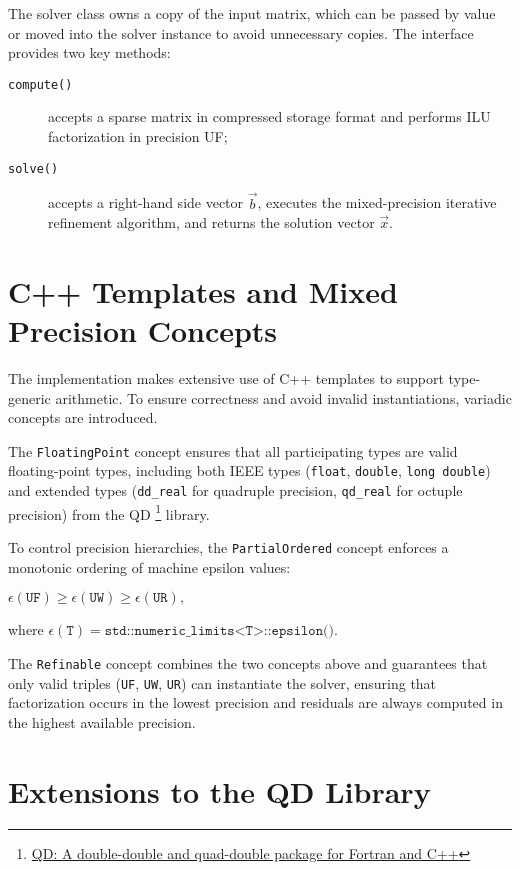 The solver class owns a copy of the input matrix, which can be passed by value
or moved into the solver instance to avoid unnecessary copies. The interface
provides two key methods:
\begin{description}
\item[\texttt{compute()}] accepts a sparse matrix in compressed storage format and performs
  ILU factorization in precision UF;
\item[\texttt{solve()}] accepts a right-hand side vector \(\vec{b}\), executes the mixed-precision
  iterative refinement algorithm, and returns the solution vector \(\vec{x}\).
\end{description}

\section{C++ Templates and Mixed Precision Concepts}
\label{sec:c++-templates-mixed}

The implementation makes extensive use of C++ templates to support type-generic
arithmetic. To ensure correctness and avoid invalid instantiations, variadic
concepts are introduced.

The \texttt{FloatingPoint} concept ensures that all participating types are valid
floating-point types, including both IEEE types (\texttt{float},
\texttt{double}, \texttt{long double}) and extended types (\texttt{dd\_real} for
quadruple precision, \texttt{qd\_real} for octuple precision) from the QD
\footnote{\href{https://github.com/BL-highprecision/QD}{QD: A double-double and
    quad-double package for Fortran and C++}} library.

To control precision hierarchies, the \texttt{PartialOrdered} concept enforces a
monotonic ordering of machine epsilon values:
\begin{center}
  \(\epsilon(\texttt{UF}) \ge \epsilon(\texttt{UW}) \ge \epsilon(\texttt{UR}),\)
\end{center}
where \(\epsilon(\texttt{T}) = \texttt{std::numeric\_limits<T>::epsilon()}.\)

The \texttt{Refinable} concept combines the two concepts above and guarantees that
only valid triples (\texttt{UF}, \texttt{UW}, \texttt{UR}) can instantiate the solver, ensuring
that factorization occurs in the lowest precision and residuals are always
computed in the highest available precision.

\section{Extensions to the QD Library}
\label{sec:extens-qd-libr}

